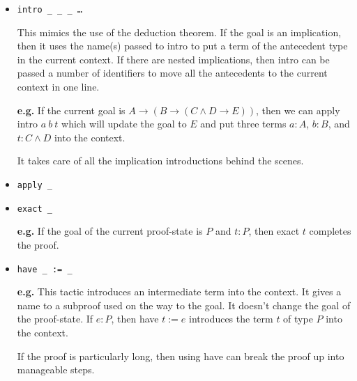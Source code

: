 \documentclass[12pt]{article}
\begin{document}
\begin{itemize}
  \item \texttt{intro \_ \_ \_ \dots}
  
  This mimics the use of the deduction theorem. If the goal is an implication, then it uses the name(s) passed to intro to put a term of the antecedent type in the current context. If there are nested implications, then intro can be passed a number of identifiers to move all the antecedents to the current context in one line. 
  
  {\bf e.g.} If the current goal is $A \to (B \to (C \land D \to E))$, then we can apply intro $a \ b \ t$ which will update the goal to $E$ and put three terms $a : A$, $b : B$, and $t : C\land D$ into the context. 
  
  It takes care of all the implication introductions behind the scenes.
  
  \item \texttt{apply \_}
  \item \texttt{exact \_}
  
  {\bf e.g.} If the goal of the current proof-state is $P$ and $t : P$, then exact $t$ completes the proof.
  
  \item \texttt{have \_ := \_}
  
  {\bf e.g.} This tactic introduces an intermediate term into the context. It gives a name to a subproof used on the way to the goal. It doesn't change the goal of the proof-state. If $e : P$, then have $t := e$ introduces the term $t$ of type $P$ into the context.
  
  If the proof is particularly long, then using have can break the proof up into manageable steps.
  
\end{itemize}
\end{document}
